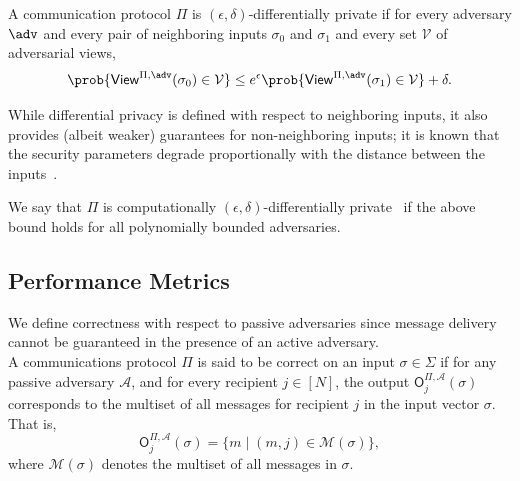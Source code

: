 \begin{definition}  \label{def:dp}
    A communication protocol $\Pi$ is $(\epsilon, \delta)$-differentially private if for every adversary $\adv$ and every pair of neighboring inputs $\sigma_0$ and $\sigma_1$ and every set $\mathcal{V}$ of adversarial views, 
    \[
    \prob{\mathsf{View}^{\Pi, \adv}(\sigma_0) \in \mathcal{V}} \le e^\epsilon \prob{\mathsf{View}^{\Pi, \adv}(\sigma_1) \in \mathcal{V}} + \delta .
    \]
    
    While differential privacy is defined with respect to neighboring inputs, it also provides (albeit weaker) guarantees for non-neighboring inputs; it is known that the security parameters degrade proportionally with the distance between the inputs~\cite{TCC:DMNS06}.

    We say that $\Pi$ is computationally $(\epsilon,\delta)$-differentially private~\cite{C:MPRV09} if the above bound holds for all polynomially bounded adversaries.\\
\end{definition} 

\subsection{Performance Metrics}

\begin{definition} [Correctness] \label{def:correctness}
    We define correctness with respect to passive adversaries since message delivery cannot be guaranteed in the presence of an active adversary.
    \\
    
    A communications protocol $\Pi$ is said to be correct on an input $\sigma \in \Sigma$ if for any passive adversary $\mathcal{A}$, and for every recipient $j \in [N]$, the output $\mathsf{O}^{\Pi, \mathcal{A}}_j(\sigma)$ corresponds to the multiset of all messages for recipient $j$ in the input vector $\sigma$. That is,
    $$
    \mathsf{O}^{\Pi, \mathcal{A}}_j(\sigma) = \{m \mid (m, j) \in \mathcal{M}(\sigma)\},
    $$
    where $\mathcal{M}(\sigma)$ denotes the multiset of all messages in $\sigma$. \\
\end{definition}

